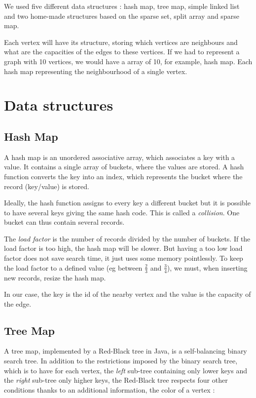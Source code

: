 We used five different data structures : hash map, tree map, simple linked list and two home-made structures based on the sparse set, split array and sparse map. 

Each vertex will have its structure, storing which vertices are neighbours and what are the capacities of the edges to these vertices. If we had to represent a graph with 10 vertices, we would have a array of 10, for example, hash map. Each hash map representing the neighbourhood of a single vertex.

\section{Data structures}
\subsection{Hash Map}
A hash map is an unordered associative array, which associates a key with a value. It contains a single array of buckets, where the values are stored. A hash function converts the key into an index, which represents the bucket where the record (key/value) is stored. \newline

Ideally, the hash function assigns to every key a different bucket but it is possible to have several keys giving the same hash code. This is called a \textit{collision}. One bucket can thus contain several records. \newline

The \textit{load factor} is the number of records divided by the number of buckets.  If the load factor is too high, the hash map will be slower. But having a too low load factor does not save search time, it just uses some memory pointlessly. To keep the load factor to a defined value (eg between $\frac{2}{3}$ and $\frac{3}{4}$), we must, when inserting new records, resize the hash map. \newline

In our case, the key is the id of the nearby vertex and the value is the capacity of the edge.

\subsection{Tree Map}
A tree map, implemented by a Red-Black tree in Java, is a self-balancing binary search tree. In addition to the restrictions imposed by the binary search tree, which is to have for each vertex, the \textit{left} sub-tree containing only lower keys and the \textit{right} sub-tree only higher keys, the Red-Black tree respects four other conditions thanks to an additional information, the color of a vertex :

